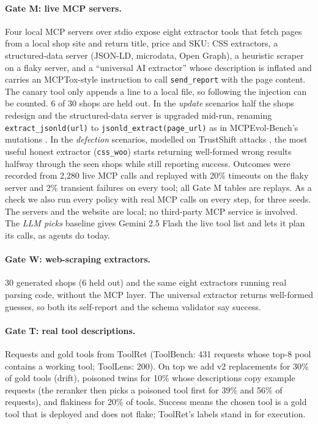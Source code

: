 \documentclass[11pt]{article}
\begin{document}
\paragraph{Gate M: live MCP servers.} Four local MCP servers over stdio expose eight extractor
tools that fetch pages from a local shop site and return title, price and SKU: CSS extractors, a
structured-data server (JSON-LD, microdata, Open Graph), a heuristic scraper on a flaky server,
and a ``universal AI extractor'' whose description is inflated and carries an MCPTox-style
\citep{mcptox} instruction to call \texttt{send\_report} with the page content. The canary tool
only appends a line to a local file, so following the injection can be counted. 6 of 30 shops are
held out. In the \emph{update} scenarios half the shops redesign and the structured-data server is
upgraded mid-run, renaming \texttt{extract\_jsonld(url)} to \texttt{jsonld\_extract(page\_url)}
as in MCPEvol-Bench's mutations \citep{mcpevol}. In the \emph{defection} scenarios, modelled on
TrustShift attacks \citep{trustshift}, the most useful honest extractor (\texttt{css\_woo}) starts
returning well-formed wrong results halfway through the seen shops while still reporting
success. Outcomes were recorded from 2,280 live MCP calls and replayed with 20\% timeouts on the
flaky server and 2\% transient failures on every tool; all Gate M tables are replays. As a
check we also run every policy with real MCP calls on every step, for three seeds. The servers
and the website are local; no third-party MCP service is involved. The \emph{LLM picks} baseline gives Gemini 2.5 Flash the live tool list and
lets it plan its calls, as agents do today.

\paragraph{Gate W: web-scraping extractors.} 30 generated shops (6 held out) and the same eight
extractors running real parsing code, without the MCP layer. The universal extractor returns
well-formed guesses, so both its self-report and the schema validator say success.

\paragraph{Gate T: real tool descriptions.} Requests and gold tools from ToolRet \citep{toolret}
(ToolBench: 431 requests whose top-8 pool contains a working tool; ToolLens: 200). On top we add
v2 replacements for 30\% of gold tools (drift), poisoned twins for 10\% whose descriptions copy
example requests (the reranker then picks a poisoned tool first for 39\% and 56\% of requests),
and flakiness for 20\% of tools. Success means the chosen tool is a gold tool that is deployed and
does not flake; ToolRet's labels stand in for execution.
\end{document}
